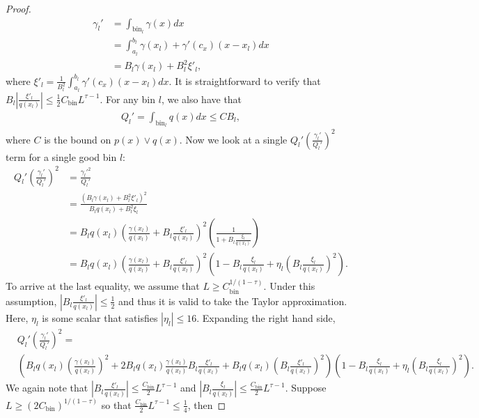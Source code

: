 \documentclass{article}
\newcommand{\bin}{\text{bin}}
\begin{document}
\begin{proof}
\begin{align*}
\gamma_l' &= \int_{\bin_l} \gamma(x) dx \\
     &=  \int_{a_l}^{b_l} \gamma(x_l) + \gamma'(c_x) (x - x_l) dx  \\
     &= B_l \gamma(x_l) + B_l^2 \xi'_l,
\end{align*}  
where $\xi'_l = \frac{1}{B_l^2} \int_{a_l}^{b_l} \gamma'(c_x)(x - x_l) dx$. It is straightforward to verify that $ B_l \left| \frac{\xi'_l}{q(x_l)}\right| \leq \frac{1}{2} C_\bin L^{\tau - 1}$. For any bin $l$, we also have that
\begin{align*}
Q_l' = \int_{\bin_l} q(x) dx \leq C B_l,
\end{align*}
where $C$ is the bound on $p(x) \vee q(x)$. Now we look at a single $Q_l' \left( \frac{\gamma_l'}{Q_l'} \right)^2$ term for a single good bin $l$:
\begin{align*}
Q_l' \left( \frac{\gamma_l'}{Q_l'} \right)^2 &= \frac{\gamma_l'^2}{Q_l'} \\
   &= \frac{ (B_l \gamma(x_l) + B_l^2 \xi'_l)^2}{B_l q(x_l) + B_l^2 \xi_l} \\
   &= B_l q(x_l) \left( \frac{\gamma(x_l)}{q(x_l)} + B_l \frac{\xi'_l}{q(x_l)} \right)^2 
         \left( \frac{1}{1 + B_l \frac{\xi_l}{q(x_l)} } \right) \\
   &=  B_l q(x_l) \left( \frac{\gamma(x_l)}{q(x_l)} + B_l \frac{\xi'_l}{q(x_l)} \right)^2 
         \left( 1 - B_l \frac{\xi_l}{q(x_l)} + \eta_l ( B_l \frac{\xi_l}{q(x_l)} )^2 \right).
\end{align*}
To arrive at the last equality, we assume that $L \geq  C_\bin^{1/(1-\tau)}$. Under this assumption, $\left| B_l \frac{\xi'_l}{q(x_l)} \right| \leq \frac{1}{2}$ and thus it is valid to take the Taylor approximation. Here, $\eta_l$ is some scalar that satisfies $|\eta_l| \leq 16$.
Expanding the right hand side,
\begin{align*}
& Q_l' \left( \frac{\gamma_l'}{Q_l'} \right)^2 =  \\
 &  \left( B_l q(x_l) \left( \frac{\gamma(x_l)}{q(x_l)} \right)^2 + 
          2B_l q(x_l) \frac{\gamma(x_l)}{q(x_l)} B_l \frac{\xi'_l}{q(x_l)} +
          B_l q(x_l) \left( B_l \frac{\xi'_l}{q(x_l)} \right)^2 \right) 
       \left( 1 - B_l \frac{\xi_l}{q(x_l)} + \eta_l ( B_l \frac{\xi_l}{q(x_l)} )^2 \right).
\end{align*}
We again note that $\left| B_l \frac{\xi'_l}{q(x_l)} \right| \leq \frac{C_\bin}{2} L^{\tau-1}$ and 
$\left| B_l \frac{\xi_l}{q(x_l)} \right| \leq \frac{C_\bin}{2} L^{\tau-1}$. Suppose $L \geq (2C_\bin)^{1/(1-\tau)}$ so that $\frac{C_\bin}{2} L^{\tau - 1} \leq \frac{1}{4}$, then

\end{proof}
\end{document}
